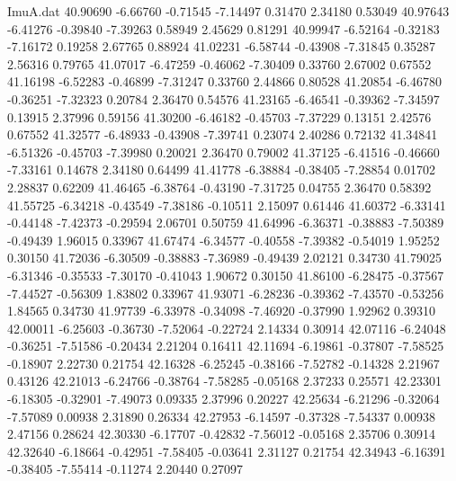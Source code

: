 \begin{filecontents}{ImuA.dat}
  40.90690   -6.66760   -0.71545   -7.14497    0.31470    2.34180    0.53049
  40.97643   -6.41276   -0.39840   -7.39263    0.58949    2.45629    0.81291
  40.99947   -6.52164   -0.32183   -7.16172    0.19258    2.67765    0.88924
  41.02231   -6.58744   -0.43908   -7.31845    0.35287    2.56316    0.79765
  41.07017   -6.47259   -0.46062   -7.30409    0.33760    2.67002    0.67552
  41.16198   -6.52283   -0.46899   -7.31247    0.33760    2.44866    0.80528
  41.20854   -6.46780   -0.36251   -7.32323    0.20784    2.36470    0.54576
  41.23165   -6.46541   -0.39362   -7.34597    0.13915    2.37996    0.59156
  41.30200   -6.46182   -0.45703   -7.37229    0.13151    2.42576    0.67552
  41.32577   -6.48933   -0.43908   -7.39741    0.23074    2.40286    0.72132
  41.34841   -6.51326   -0.45703   -7.39980    0.20021    2.36470    0.79002
  41.37125   -6.41516   -0.46660   -7.33161    0.14678    2.34180    0.64499
  41.41778   -6.38884   -0.38405   -7.28854    0.01702    2.28837    0.62209
  41.46465   -6.38764   -0.43190   -7.31725    0.04755    2.36470    0.58392
  41.55725   -6.34218   -0.43549   -7.38186   -0.10511    2.15097    0.61446
  41.60372   -6.33141   -0.44148   -7.42373   -0.29594    2.06701    0.50759
  41.64996   -6.36371   -0.38883   -7.50389   -0.49439    1.96015    0.33967
  41.67474   -6.34577   -0.40558   -7.39382   -0.54019    1.95252    0.30150
  41.72036   -6.30509   -0.38883   -7.36989   -0.49439    2.02121    0.34730
  41.79025   -6.31346   -0.35533   -7.30170   -0.41043    1.90672    0.30150
  41.86100   -6.28475   -0.37567   -7.44527   -0.56309    1.83802    0.33967
  41.93071   -6.28236   -0.39362   -7.43570   -0.53256    1.84565    0.34730
  41.97739   -6.33978   -0.34098   -7.46920   -0.37990    1.92962    0.39310
  42.00011   -6.25603   -0.36730   -7.52064   -0.22724    2.14334    0.30914
  42.07116   -6.24048   -0.36251   -7.51586   -0.20434    2.21204    0.16411
  42.11694   -6.19861   -0.37807   -7.58525   -0.18907    2.22730    0.21754
  42.16328   -6.25245   -0.38166   -7.52782   -0.14328    2.21967    0.43126
  42.21013   -6.24766   -0.38764   -7.58285   -0.05168    2.37233    0.25571
  42.23301   -6.18305   -0.32901   -7.49073    0.09335    2.37996    0.20227
  42.25634   -6.21296   -0.32064   -7.57089    0.00938    2.31890    0.26334
  42.27953   -6.14597   -0.37328   -7.54337    0.00938    2.47156    0.28624
  42.30330   -6.17707   -0.42832   -7.56012   -0.05168    2.35706    0.30914
  42.32640   -6.18664   -0.42951   -7.58405   -0.03641    2.31127    0.21754
  42.34943   -6.16391   -0.38405   -7.55414   -0.11274    2.20440    0.27097

\end{filecontents}
